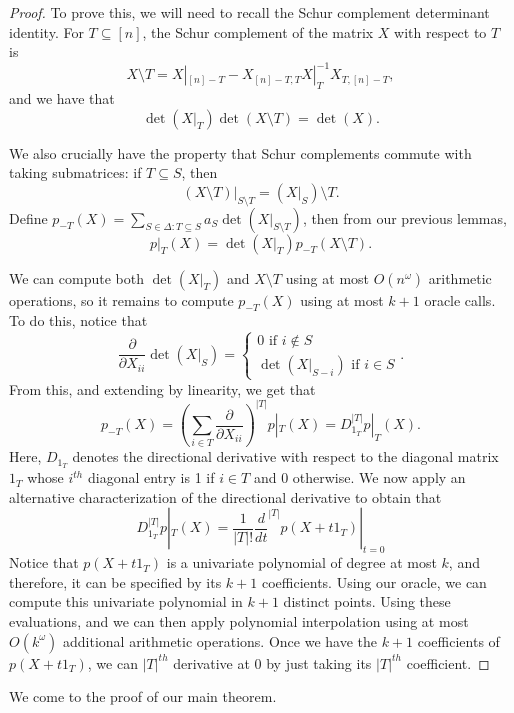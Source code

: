 \documentclass{amsart}
\theoremstyle{definition}
\begin{document}
\begin{proof}
    To prove this, we will need to recall the Schur complement determinant identity.
    For $T \subseteq [n]$, the Schur complement of the matrix $X$ with respect to $T$ is
    \[
    X \setminus T = X|_{[n] - T} - X_{[n]-T,T} X|_T^{-1} X_{T,[n]-T},
    \]
    and we have that
    \[
    \det(X|_T) \det(X \setminus T) = \det(X).
    \]

    We also crucially have the property that Schur complements commute with taking submatrices: if $T \subseteq S$, then
    \[
    (X \setminus T)|_{S \setminus T} = (X|_S)\setminus T.
    \]
    Define $p_{-T}(X) = \sum_{S \in \Delta : T \subseteq S} a_S\det(X|_{S\setminus T})$, then from our previous lemmas,
    \[
    p|_T(X) = \det(X|_T) p_{-T}(X \setminus T).
    \]

    We can compute both $\det(X|_T)$ and $X \setminus T$ using at most $O(n^{\omega})$ arithmetic operations, so it remains to compute $ p_{-T}(X)$ using at most $k+1$ oracle calls. To do this, notice that
    \[
    \frac{\partial }{\partial X_{ii}} \det(X|_S) = \begin{cases} 0 \text{ if }i \not \in S\\ \det(X|_{S - i}) \text{ if } i \in S \end{cases}.
    \]
    From this, and extending by linearity, we get that
    \[
    p_{-T}(X) =  (\sum_{i \in T} \frac{\partial}{\partial X_{ii}})^{|T|} p|_T(X) = D_{1_{T}}^{|T|} p|_T(X).
    \]
    Here, $D_{1_{T}}$ denotes the directional derivative with respect to the diagonal matrix $1_T$ whose $i^{th}$ diagonal entry is 1 if $i \in T$ and 0 otherwise.
    We now apply an alternative characterization of the directional derivative to obtain that
    \[
    D_{1_T}^{|T|} p|_T(X) = \frac{1}{|T|!}\frac{d}{dt}^{|T|}p(X + t 1_T)|_{t = 0}
    \]
    Notice that $p(X + t 1_T)$ is a univariate polynomial of degree at most $k$, and therefore, it can be specified by its $k+1$ coefficients.
    Using our oracle, we can compute this univariate polynomial in $k+1$ distinct points.
    Using these evaluations, and we can then apply polynomial interpolation using at most $O(k^{\omega})$ additional arithmetic operations.
    Once we have the $k+1$ coefficients of $p(X+t1_T)$, we can $|T|^{th}$ derivative at 0 by just taking its $|T|^{th}$ coefficient.
\end{proof}
We come to the proof of our main theorem.
\end{document}
